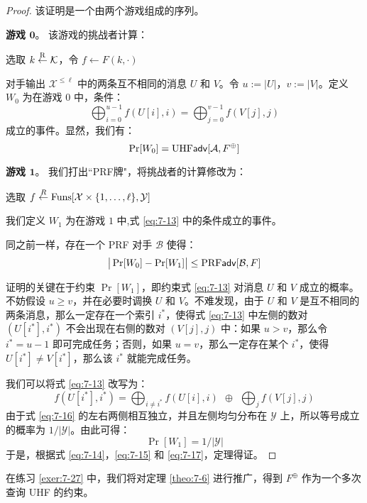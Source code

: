 \begin{proof}
该证明是一个由两个游戏组成的序列。

\vspace{5pt}

\noindent\textbf{游戏 $\mathbf{0}$}。
该游戏的挑战者计算：

\vspace{5pt}

\hspace*{5pt} 选取 $k\overset{\rm R}\leftarrow\mathcal{K}$，令 $f\leftarrow F(k,\cdot)$

\vspace{5pt}

\noindent
对手输出 $\mathcal{X}^{\leq\ell}$ 中的两条互不相同的消息 $U$ 和 $V$。令 $u:=|U|$，$v:=|V|$。定义 $W_0$ 为在游戏 $0$ 中，条件：
\begin{equation}\label{eq:7-13}
\bigoplus_{i=0}^{u-1}f(U[i],i)=\bigoplus_{j=0}^{v-1}f(V[j],j)
\end{equation}
成立的事件。显然，我们有：
\begin{equation}\label{eq:7-14}
\Pr[W_0]={\rm UHF}\mathsf{adv}[\mathcal{A},F^\oplus]
\end{equation}

\noindent\textbf{游戏 $\mathbf{1}$}。
我们打出``PRF牌"，将挑战者的计算修改为：

\vspace{5pt}

\hspace*{5pt} 选取 $f\overset{R}\leftarrow{\rm Funs}[\mathcal{X}\times\{1,\dots,\ell\},\mathcal{Y}]$

\vspace{5pt}

\noindent
我们定义 $W_1$ 为在游戏 $1$ 中,式 \ref{eq:7-13} 中的条件成立的事件。

同之前一样，存在一个 PRF 对手 $\mathcal{B}$ 使得：
\begin{equation}\label{eq:7-15}
\big\lvert\Pr[W_0]-\Pr[W_1]\big\rvert\leq{\rm PRF}\mathsf{adv}[\mathcal{B},F]
\end{equation}

\noindent
证明的关键在于约束 $\Pr[W_1]$，即约束式 \ref{eq:7-13} 对消息 $U$ 和 $V$ 成立的概率。不妨假设 $u\geq v$，并在必要时调换 $U$ 和 $V$。不难发现，由于 $U$ 和 $V$ 是互不相同的两条消息，那么一定存在一个索引 $i^*$，使得式 \ref{eq:7-13} 中左侧的数对 $(U[i^*],i^*)$ 不会出现在右侧的数对 $(V[j],j)$ 中：如果 $u>v$，那么令 $i^*=u-1$ 即可完成任务；否则，如果 $u=v$，那么一定存在某个 $i^*$，使得 $U[i^*]\neq V[i^*]$，那么该 $i^*$ 就能完成任务。

我们可以将式 \ref{eq:7-13} 改写为：
\begin{equation}\label{eq:7-16}
f(U[i^*],i^*)=\bigoplus_{i\neq i^*}f(U[i],i)\ \ \oplus\ \ \bigoplus_jf(V[j],j)
\end{equation}
由于式 \ref{eq:7-16} 的左右两侧相互独立，并且左侧均匀分布在 $\mathcal{Y}$ 上，所以等号成立的概率为 ${1}/{|\mathcal{Y}|}$。由此可得：
\begin{equation}\label{eq:7-17}
\Pr[W_1]={1}/{|\mathcal{Y}|}
\end{equation}
于是，根据式 \ref{eq:7-14}，\ref{eq:7-15} 和 \ref{eq:7-17}，定理得证。
\end{proof}

在练习 \ref{exer:7-27} 中，我们将对定理 \ref{theo:7-6} 进行推广，得到 $F^\oplus$ 作为一个多次查询 UHF 的约束。